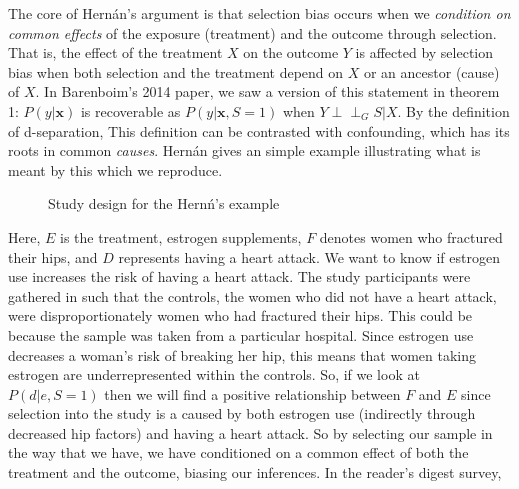 \documentclass[12pt,twoside]{reedthesis}
\theoremstyle{definition}
\newcommand{\dsep}{\perp \!\!\!\perp}
\begin{document}
The core of Hern\'an's argument is that selection bias occurs when we \emph{condition on common effects} of the exposure (treatment) and the outcome through selection. That is, the effect of the treatment $X$ on the outcome $Y$ is affected by selection bias when both selection and the treatment depend on $X$ or an ancestor (cause) of $X$.  In Barenboim's  2014 paper, we saw a version of this statement in theorem 1: $P(y|\mathbf{x})$ is recoverable as $P(y|\mathbf{x}, S = 1)$ when $Y \dsep_G S | X$. By the definition of d-separation,  This definition can be contrasted with confounding, which has its roots in common \emph{causes}. Hern\'an gives an simple example illustrating what is meant by this which we reproduce. 

\begin{figure}[H]
\begin{center}
\end{center}
\caption{Study design for the Hern\'n's example}
\end{figure}

Here, $E$ is the treatment, estrogen supplements, $F$ denotes women who fractured their hips, and $D$ represents having a heart attack. We want to know if estrogen use increases the risk of having a heart attack. The study participants were gathered in such that the controls, the women who did not have a heart attack, were disproportionately women who had fractured their hips. This could be because the sample was taken from a particular hospital. Since estrogen use decreases a woman's risk of breaking her hip, this means that women taking estrogen are underrepresented within the controls. So, if we look at $P(d | e, S = 1)$ then we will find a positive relationship between $F$ and $E$ since selection into the study is a caused by both estrogen use (indirectly through decreased hip factors) and having a heart attack. So by selecting our sample in the way that we have, we have conditioned on a common effect of both the treatment and the outcome, biasing our inferences. In the reader's digest survey, 
\end{document}
